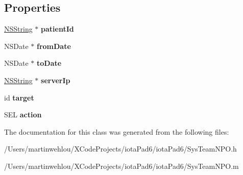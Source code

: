 \subsection*{Properties}
\begin{DoxyCompactItemize}
\item 
\hypertarget{interface_sys_team_n_p_o_add66a84eba3bc28794d3d12de7cd55a8}{
\hyperlink{class_n_s_string}{NSString} $\ast$ {\bfseries patientId}}
\label{interface_sys_team_n_p_o_add66a84eba3bc28794d3d12de7cd55a8}

\item 
\hypertarget{interface_sys_team_n_p_o_a790e06ff6f9bdd08fb01a5df3fc0a27f}{
NSDate $\ast$ {\bfseries fromDate}}
\label{interface_sys_team_n_p_o_a790e06ff6f9bdd08fb01a5df3fc0a27f}

\item 
\hypertarget{interface_sys_team_n_p_o_aed0fa91dc6c9760177c2be80665401cc}{
NSDate $\ast$ {\bfseries toDate}}
\label{interface_sys_team_n_p_o_aed0fa91dc6c9760177c2be80665401cc}

\item 
\hypertarget{interface_sys_team_n_p_o_af2585ab3d16a3bbeb1cc37f1996cd13e}{
\hyperlink{class_n_s_string}{NSString} $\ast$ {\bfseries serverIp}}
\label{interface_sys_team_n_p_o_af2585ab3d16a3bbeb1cc37f1996cd13e}

\item 
\hypertarget{interface_sys_team_n_p_o_a54f3c8c041e9583b2f9c63f9bb75c52f}{
id {\bfseries target}}
\label{interface_sys_team_n_p_o_a54f3c8c041e9583b2f9c63f9bb75c52f}

\item 
\hypertarget{interface_sys_team_n_p_o_a3f051fb719d682c9fb984dd6c8637848}{
SEL {\bfseries action}}
\label{interface_sys_team_n_p_o_a3f051fb719d682c9fb984dd6c8637848}

\end{DoxyCompactItemize}


The documentation for this class was generated from the following files:\begin{DoxyCompactItemize}
\item 
/Users/martinwehlou/XCodeProjects/iotaPad6/iotaPad6/SysTeamNPO.h\item 
/Users/martinwehlou/XCodeProjects/iotaPad6/iotaPad6/SysTeamNPO.m\end{DoxyCompactItemize}
